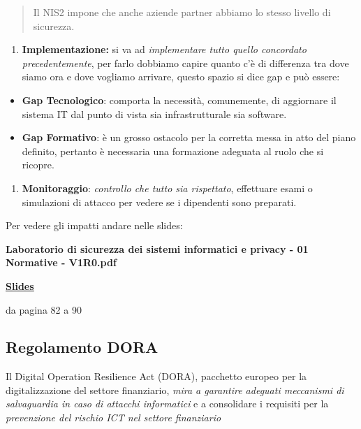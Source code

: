 \begin{quote}
Il NIS2 impone che anche aziende partner abbiamo lo stesso livello di
sicurezza.
\end{quote}

\begin{enumerate}
\def\labelenumi{\arabic{enumi}.}
\setcounter{enumi}{2}
\item
  \textbf{Implementazione:} si va ad \emph{implementare tutto quello
  concordato precedentemente}, per farlo dobbiamo capire quanto c'è di
  differenza tra dove siamo ora e dove vogliamo arrivare, questo spazio
  si dice gap e può essere:
\end{enumerate}

\begin{itemize}
\item
  \textbf{Gap Tecnologico}: comporta la necessità, comunemente, di
  aggiornare il sistema IT dal punto di vista sia infrastrutturale sia
  software.
\item
  \textbf{Gap Formativo}: è un grosso ostacolo per la corretta messa in
  atto del piano definito, pertanto è necessaria una formazione adeguata
  al ruolo che si ricopre.
\end{itemize}

\begin{enumerate}
\def\labelenumi{\arabic{enumi}.}
\setcounter{enumi}{3}
\item
  \textbf{Monitoraggio}: \emph{controllo che tutto sia rispettato},
  effettuare esami o simulazioni di attacco per vedere se i dipendenti
  sono preparati.
\end{enumerate}

Per vedere gli impatti andare nelle slides:

\textbf{Laboratorio di sicurezza dei sistemi informatici e privacy - 01
Normative - V1R0.pdf}

\href{https://liveunibo.sharepoint.com/:b:/s/LoPTSI_SedediImola/ET-eiun98a9BjHi7_UkTr2UBPhpsrulx9aFysJbld1LSZg?e=EHG2ot}{\textbf{\ul{Slides}}}

da pagina 82 a 90

\subsection{Regolamento DORA}\label{regolamento-dora}

Il Digital Operation Resilience Act (DORA), pacchetto europeo per la
digitalizzazione del settore finanziario, \emph{mira a garantire
adeguati meccanismi di salvaguardia in caso di attacchi informatici} e a
consolidare i requisiti per la \emph{prevenzione del rischio ICT nel
settore finanziario}

